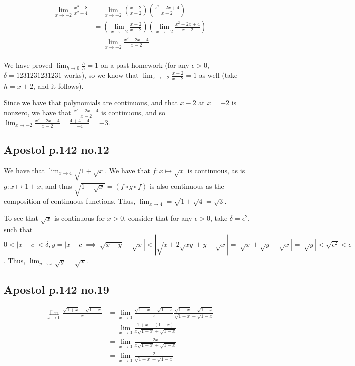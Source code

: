 \documentclass[12pt,letterpaper]{article}
\theoremstyle{definition}
\begin{document}
\begin{align*}
  \lim_{x\rightarrow -2} \frac{x^3 + 8}{x^2 - 4} &= \lim_{x\rightarrow -2} (\frac{x+2}{x+2})(\frac{x^2 - 2x + 4}{x-2}) \\
                                                 &= (\lim_{x\rightarrow -2}\frac{x+2}{x+2})(\lim_{x\rightarrow -2} \frac{x^2 -2x +4}{x-2}) \\
                                                 &= \lim_{x\rightarrow -2}\frac{x^2 -2x + 4}{x-2}\\
\end{align*}

We have proved $\lim_{h\rightarrow 0}\frac{h}{h} = 1$ on a past homework (for
any $\epsilon > 0$, $\delta = 1231231231231$ works), so we know that
$\lim_{x\rightarrow -2}\frac{x+2}{x+2} = 1$ as well (take $h = x+2$, and it follows).

Since we have that polynomials are continuous, and that $x-2$ at $x = -2$ is
nonzero, we have that $\frac{x^2 -2x + 4}{x-2}$ is continuous, and so
$\lim_{x\rightarrow -2}\frac{x^2 - 2x +4}{x-2} = \frac{4 + 4+ 4}{-4} = -3$.


\subsection*{Apostol p.142 no.12}

We have that $\lim_{x\rightarrow 4} \sqrt{1 + \sqrt{x}}$. We have that $f:x
\mapsto \sqrt{x}$ is continuous, as is $g:x \mapsto 1 + x$, and thus $\sqrt{1 +
  \sqrt{x}} = (f \circ g \circ f)$ is also continuous as the composition of
continuous functions. Thus, $\lim_{x\rightarrow
  4} = \sqrt{1 + \sqrt{4}} = \sqrt{3}$.

To see that $\sqrt{x}$ is continuous for $x > 0$, consider that for any $\epsilon > 0$, take
$\delta = \epsilon^2 $, such that $0 < |x-c| < \delta, y = |x - c| \implies
|\sqrt{x + y} - \sqrt{x}| < |\sqrt{x + 2\sqrt{xy} + y} - \sqrt{x}| = |\sqrt{x} +
\sqrt{y} - \sqrt{x}| = |\sqrt{y}| < \sqrt{\epsilon^2} < \epsilon$. Thus,
$\lim_{y\rightarrow x} \sqrt{y} = \sqrt{x}$.

\subsection*{Apostol p.142 no.19}

\begin{align*}
  \lim_{x\rightarrow 0} \frac{\sqrt{1+x} - \sqrt{1-x}}{x} &= \lim_{x\rightarrow 0} \frac{\sqrt{1+x} - \sqrt{1-x}}{x}\frac{\sqrt{1+x}+\sqrt{1-x}}{\sqrt{1+x}+\sqrt{1-x}} \\
                                                          &= \lim_{x\rightarrow 0} \frac{1+x - (1-x)}{x\sqrt{1+x}+\sqrt{1-x}} \\
                                                          &= \lim_{x\rightarrow 0} \frac{2x}{x\sqrt{1+x}+\sqrt{1-x}} \\
                                                          &= \lim_{x\rightarrow 0} \frac{2}{\sqrt{1+x}+\sqrt{1-x}} \\
\end{align*}
\end{document}
